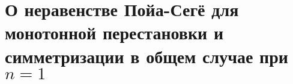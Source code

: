 \chapter{О неравенстве Пойа-Сегё для монотонной перестановки и симметризации в общем случае при $n = 1$}
\label{chapt:unbounded}







